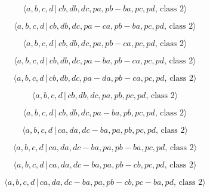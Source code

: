 \documentclass[10pt]{article}
\begin{document}
\begin{equation}
\langle a,b,c,d\,|\,cb,db,dc,pa,pb-ba,pc,pd,\,\text{class }2\rangle 
\tag{7.3211}
\end{equation}

\begin{equation}
\langle a,b,c,d\,|\,cb,db,dc,pa-ca,pb-ba,pc,pd,\,\text{class }2\rangle 
\tag{7.3212}
\end{equation}

\begin{equation}
\langle a,b,c,d\,|\,cb,db,dc,pa,pb-ca,pc,pd,\,\text{class }2\rangle 
\tag{7.3213}
\end{equation}

\begin{equation}
\langle a,b,c,d\,|\,cb,db,dc,pa-ba,pb-ca,pc,pd,\,\text{class }2\rangle 
\tag{7.3214}
\end{equation}

\begin{equation}
\langle a,b,c,d\,|\,cb,db,dc,pa-da,pb-ca,pc,pd,\,\text{class }2\rangle 
\tag{7.3215}
\end{equation}

\begin{equation}
\langle a,b,c,d\,|\,cb,db,dc,pa,pb,pc,pd,\,\text{class }2\rangle 
\tag{7.3216}
\end{equation}

\begin{equation}
\langle a,b,c,d\,|\,cb,db,dc,pa-ba,pb,pc,pd,\,\text{class }2\rangle 
\tag{7.3217}
\end{equation}

\begin{equation}
\langle a,b,c,d\,|\,ca,da,dc-ba,pa,pb,pc,pd,\,\text{class }2\rangle 
\tag{7.3218}
\end{equation}

\begin{equation}
\langle a,b,c,d\,|\,ca,da,dc-ba,pa,pb-ba,pc,pd,\,\text{class }2\rangle 
\tag{7.3219}
\end{equation}

\begin{equation}
\langle a,b,c,d\,|\,ca,da,dc-ba,pa,pb-cb,pc,pd,\,\text{class }2\rangle 
\tag{7.3220}
\end{equation}

\begin{equation}
\langle a,b,c,d\,|\,ca,da,dc-ba,pa,pb-cb,pc-ba,pd,\,\text{class }2\rangle 
\tag{7.3221}
\end{equation}
\end{document}
